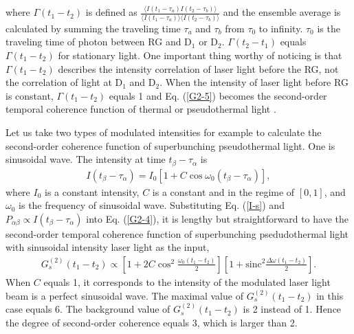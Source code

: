 \documentclass[12pt]{iopart}
\begin{document}
where $\Gamma(t_1-t_2)$ is defined as $ \frac{\langle I(t_1-\tau_a) I(t_2-\tau_b)  \rangle}{\langle I(t_1-\tau_a) \rangle \langle I(t_2-\tau_b)  \rangle}$ and  the ensemble average is calculated by summing the traveling time $\tau_a$ and $\tau_b$ from $\tau_0$ to infinity. $\tau_0$ is the traveling time of photon between RG and D$_1$ or D$_2$. $\Gamma(t_2-t_1)$  equals  $\Gamma(t_1-t_2)$ for stationary light. One important thing worthy of noticing is that $\Gamma(t_1-t_2)$ describes the intensity correlation of laser light before the RG, not the correlation of light at D$_1$ and D$_2$. When the intensity of laser light before RG is constant, $\Gamma(t_1-t_2)$ equals 1 and Eq. (\ref{G2-5}) becomes the second-order temporal coherence function of thermal or pseudothermal light \cite{martienssen,shih-book}. 

Let us take two types of modulated intensities for example to calculate the second-order coherence function of superbunching pseudothermal light. One is sinusoidal wave. The intensity at time $t_\beta-\tau_\alpha$ is
\begin{eqnarray}\label{I-s}
I(t_\beta-\tau_\alpha)=I_0[1+C\cos\omega_0(t_\beta-\tau_\alpha)] ,
\end{eqnarray}
where $I_0$ is a constant intensity,  $C$ is a constant and in the regime of $[0,1]$, and $\omega_0$ is the frequency of sinusoidal wave. Substituting Eq. (\ref{I-s}) and $P_{\alpha\beta} \propto I(t_\beta-\tau_\alpha)$ into Eq. (\ref{G2-4}), it is lengthy but straightforward to have the second-order temporal coherence function of superbunching psedudothermal light with sinusoidal intensity laser light as the input,
\begin{eqnarray}\label{G2-s}
G^{(2)}_s(t_1-t_2)\propto [1+2C\cos^2\frac{\omega_0(t_1-t_2)}{2}] [1+ \text{sinc}^2\frac{\Delta \omega (t_1-t_2)}{2}].
\end{eqnarray}
When $C$ equals 1, it corresponds to the intensity of the modulated laser light beam is a perfect sinusoidal wave. The maximal value of $G^{(2)}_s(t_1-t_2)$ in this case equals 6. The background value of $G^{(2)}_s(t_1-t_2)$ is 2 instead of 1. Hence the degree of second-order coherence equals 3, which is larger than 2.
\end{document}
